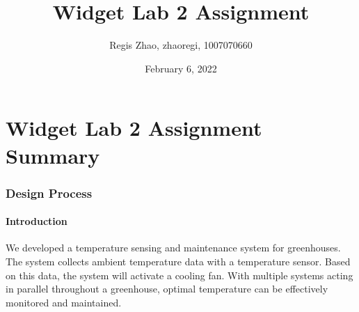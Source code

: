 \documentclass[11pt]{article}
\title{Widget Lab 2 Assignment}
\author{Regis Zhao, zhaoregi, 1007070660}
\date{February 6, 2022}
\begin{document}





\part{{\LARGE Widget Lab 2 Assignment Summary}}



\section{Design Process}

\subsection{Introduction}
We developed a temperature sensing and maintenance system for greenhouses. The system collects ambient temperature data with a temperature sensor. Based on this data, the system will activate a cooling fan. With multiple systems acting in parallel throughout a greenhouse, optimal temperature can be effectively monitored and maintained.
\end{document}
